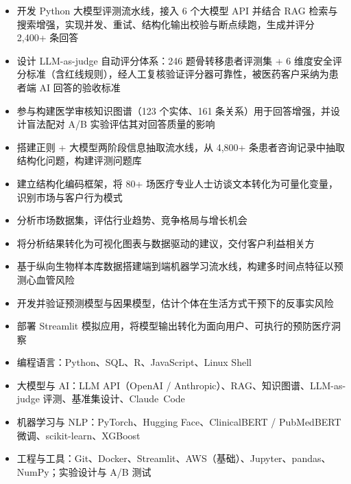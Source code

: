 \documentclass{zh_resume}
\begin{document}
\begin{itemize}
  \item 开发 Python 大模型评测流水线，接入 6 个大模型 API 并结合 RAG 检索与搜索增强，实现并发、重试、结构化输出校验与断点续跑，生成并评分 2,400+ 条回答
  \item 设计 LLM-as-judge 自动评分体系：246 题骨转移患者评测集 + 6 维度安全评分标准（含红线规则），经人工复核验证评分器可靠性，被医药客户采纳为患者端 AI 回答的验收标准
  \item 参与构建医学审核知识图谱（123 个实体、161 条关系）用于回答增强，并设计盲法配对 A/B 实验评估其对回答质量的影响
  \item 搭建正则 + 大模型两阶段信息抽取流水线，从 4,800+ 条患者咨询记录中抽取结构化问题，构建评测问题库
\end{itemize}


\begin{itemize}
  \item 建立结构化编码框架，将 80+ 场医疗专业人士访谈文本转化为可量化变量，识别市场与客户行为模式
  \item 分析市场数据集，评估行业趋势、竞争格局与增长机会
  \item 将分析结果转化为可视化图表与数据驱动的建议，交付客户利益相关方
\end{itemize}



\begin{itemize}
  \item 基于纵向生物样本库数据搭建端到端机器学习流水线，构建多时间点特征以预测心血管风险
  \item 开发并验证预测模型与因果模型，估计个体在生活方式干预下的反事实风险
  \item 部署 Streamlit 模拟应用，将模型输出转化为面向用户、可执行的预防医疗洞察
\end{itemize}

\begin{itemize}[parsep=0.5ex]
  \item 编程语言：Python、SQL、R、JavaScript、Linux Shell
  \item 大模型与 AI：LLM API（OpenAI / Anthropic）、RAG、知识图谱、LLM-as-judge 评测、基准集设计、\mbox{Claude Code}
  \item 机器学习与 NLP：PyTorch、Hugging Face、ClinicalBERT / PubMedBERT 微调、scikit-learn、XGBoost
  \item 工程与工具：Git、Docker、Streamlit、AWS（基础）、Jupyter、pandas、NumPy；实验设计与 A/B 测试
\end{itemize}
\end{document}
